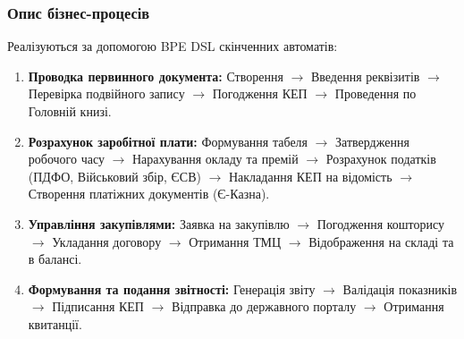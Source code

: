 \documentclass{article}
\begin{document}
\subsubsection{Опис бізнес-процесів}
Реалізуються за допомогою BPE DSL скінченних автоматів:
\begin{enumerate}
    \item \textbf{Проводка первинного документа:} Створення $\rightarrow$ Введення реквізитів $\rightarrow$ Перевірка подвійного запису $\rightarrow$ Погодження КЕП $\rightarrow$ Проведення по Головній книзі.
    \item \textbf{Розрахунок заробітної плати:} Формування табеля $\rightarrow$ Затвердження робочого часу $\rightarrow$ Нарахування окладу та премій $\rightarrow$ Розрахунок податків (ПДФО, Військовий збір, ЄСВ) $\rightarrow$ Накладання КЕП на відомість $\rightarrow$ Створення платіжних документів (Є-Казна).
    \item \textbf{Управління закупівлями:} Заявка на закупівлю $\rightarrow$ Погодження кошторису $\rightarrow$ Укладання договору $\rightarrow$ Отримання ТМЦ $\rightarrow$ Відображення на складі та в балансі.
    \item \textbf{Формування та подання звітності:} Генерація звіту $\rightarrow$ Валідація показників $\rightarrow$ Підписання КЕП $\rightarrow$ Відправка до державного порталу $\rightarrow$ Отримання квитанції.
\end{enumerate}
\end{document}
